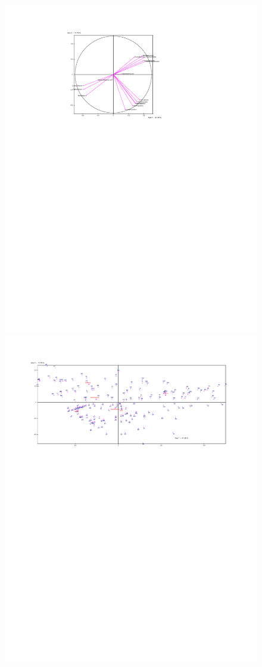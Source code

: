 \documentclass[a4paper,10pt,twocolumn]{article}
\begin{document}
\begin{figure}[!ht]
\begin{center}
\includegraphics[width=16cm]{p1a.pdf}
\includegraphics[width=17cm]{p1b.pdf}

\end{center}
\end{figure}
\end{document}
